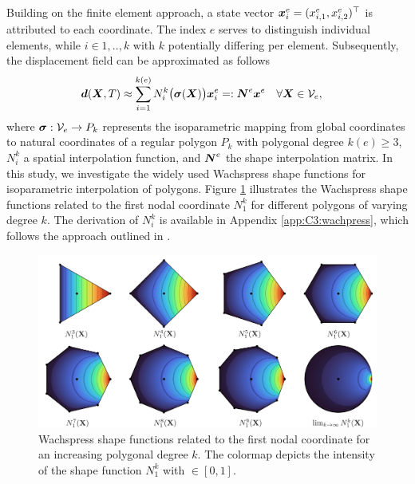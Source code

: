 Building on the finite element approach, a state vector ${\boldsymbol{x}}^e_i = (x^e_{i,1}, x^e_{i,2})^\top$ is attributed to each coordinate. The index $e$ serves to distinguish individual elements, while $i \in {1,..,k}$ with $k$ potentially differing per element. Subsequently, the displacement field can be approximated as follows
%
\begin{align}
\dB(\XB,T) &\approx \sum^{k(e)}_{i=1} N_i^{k}\big(\sigmaB(\XB)\big) \xB^{e}_i  =: \NB^{e} \xB^{e} \quad \forall \XB \in \mathcal{V}_e,%
\end{align}
%
where $\boldsymbol{\sigma}: \mathcal{V}_e \to P_{k}$ represents the isoparametric mapping from global coordinates to natural coordinates of a regular polygon $P_{k}$ with polygonal degree $k(e) \ge 3$, $N^k_i$ a spatial interpolation function, and ${\boldsymbol{N}}^{e}$ the shape interpolation matrix. In this study, we investigate the widely used Wachspress shape functions \cite{Sukumar2004Nov,Talischi2012,Talischi2012Mar,Floater2014Jun} for isoparametric interpolation of polygons. Figure \ref{fig:C3:wachpressExample} illustrates the Wachspress shape functions related to the first nodal coordinate $N^k_1$ for different polygons of varying degree $k$. The derivation of $N^k_i$ is available in Appendix \ref{app:C3:wachpress}, which follows the approach outlined in \cite{Talischi2012Mar,Floater2014Jun}.

%
\begin{figure}
\centering
\vspace{-2mm}
\includegraphics[width=\textwidth]{./pdf/thesis-figure-3-wachpress.pdf}
\caption{Wachspress shape functions related to the first nodal coordinate for an increasing polygonal degree $k$. The colormap depicts the intensity of the shape function $N_1^k$ with \protect{}$\!\!\in [0,1]$.}
\label{fig:C3:wachpressExample}
\vspace{-3mm}
\end{figure}
%

